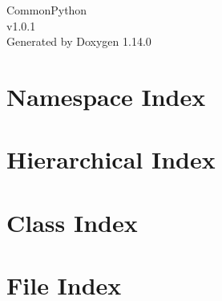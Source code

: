 \documentclass[twoside]{book}
\newcommand{\+}{\discretionary{\mbox{\scriptsize$\hookleftarrow$}}{}{}}
\newcommand{\clearemptydoublepage}{%
    \newpage{\pagestyle{empty}\cleardoublepage}%
  }
\begin{document}
  \raggedbottom
    \hypersetup{pageanchor=false,
                bookmarksnumbered=true,
                pdfencoding=unicode
               }
  \begin{titlepage}
  \vspace*{7cm}
  \begin{center}%
  {\Large Common\+Python}\\
  [1ex]\large v1.\+0.\+1 \\
  \vspace*{1cm}
  {\large Generated by Doxygen 1.14.0}\\
  \end{center}
  \end{titlepage}
  \clearemptydoublepage
  \tableofcontents
  \clearemptydoublepage
  \hypersetup{pageanchor=true}








\chapter{Namespace Index}

\chapter{Hierarchical Index}

\chapter{Class Index}

\chapter{File Index}

\end{document}

